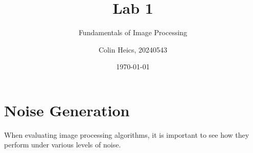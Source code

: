 \documentclass[article, 1.5space, letterpaper, 12pt, oneside, header, footer]{SydeClass}
\title{Lab 1}
\subtitle{Fundamentals of Image Processing}
\author{Colin Heics, 20240543}
\date{\today}
\begin{document}



\section{Noise Generation}

When evaluating image processing algorithms, it is important to see how they perform under various levels of noise.


\begin{figure}[ht]
\centering
\end{figure}
\end{document}

